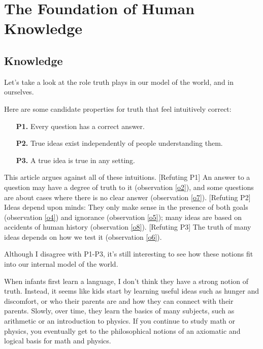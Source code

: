 \documentclass[11pt, oneside]{article}   	%
\begin{document}
\section{The Foundation of Human Knowledge}\label{s7}


\subsection{Knowledge}


Let's take a look at the role truth plays in our model of the world, and in
ourselves.

Here are some candidate properties for truth that feel intuitively correct:
\begin{itemize}
    \item[{\bf P1.}] Every question has a correct answer.
    \item[{\bf P2.}] True ideas exist independently of people understanding
        them.
    \item[{\bf P3.}] A true idea is true in any setting.
\end{itemize}
This article argues against all of these intuitions.
[Refuting P1] An answer to a question may have a degree of truth to it
(observation \ref{o2}), and some questions are about cases where
there is no clear answer (observation \ref{o7}).
[Refuting P2] Ideas depend upon minds: They only make sense in the presence of
both goals (observation \ref{o4}) and ignorance (observation \ref{o5}); many
ideas are based on accidents of human history (observation \ref{o8}).
[Refuting P3] The
truth of many ideas depends on how we test it (observation \ref{o6}).

Although I disagree with P1-P3, it's still interesting to see how these notions
fit into our internal model of the world.

When infants first learn a language,
I don't think they have a strong
notion of truth. Instead, it seems like kids start by learning
useful ideas such as
hunger and discomfort, or who their parents are and how they can connect with
their parents. Slowly, over time, they learn the basics of many subjects,
such as arithmetic or an introduction to physics.
If you continue to study math or physics, you eventually get to the
philosophical notions of an axiomatic and logical basis for math and physics.
\end{document}

